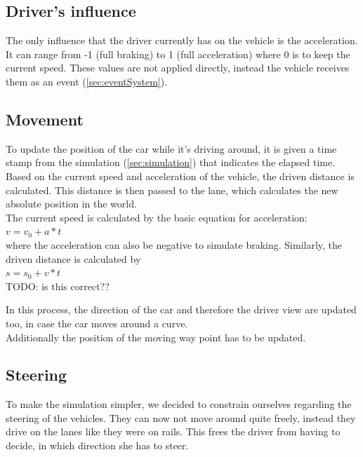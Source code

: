 \subsection{Driver's influence}
\label{sec:driverInfluence}

The only influence that the driver currently has on the vehicle is the 
acceleration. It can range from -1 (full braking) to 1 (full acceleration)
where 0 is to keep the current speed. These values are not applied directly,
instead the vehicle receives them as an event (\ref{sec:eventSystem}).

\subsection{Movement}

To update the position of the car while it's driving around, it is given
a time stamp from the simulation (\ref{sec:simulation}) that indicates 
the elapsed time. Based on the current speed and acceleration of the 
vehicle, the driven distance is calculated. This distance is then passed
to the lane, which calculates the new absolute position in the world. \\

\noindent The current speed is calculated by the basic equation for
acceleration: \\

$ v = v_0 + a * t$ \\

\noindent where the acceleration can also be negative to simulate braking.
Similarly, the driven distance is calculated by \\

$ s = s_0 + v * t $ \\

TODO: is this correct??

\noindent In this process, the direction of the car and therefore the driver
view are updated too, in case the car moves around a curve. \\

\noindent Additionally the position of the moving way point has to be updated.

\subsection{Steering}
\label{sec:steering}

To make the simulation simpler, we decided to constrain ourselves regarding
the steering of the vehicles. They can now not move around quite freely, 
instead they drive on the lanes like they were on rails. This frees the 
driver from having to decide, in which direction she has to steer.

